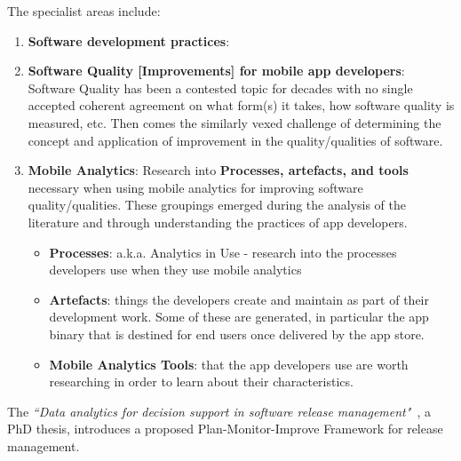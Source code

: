 The specialist areas include: 
\begin{enumerate}
    \item \textbf{Software development practices}: 
    \item \textbf{Software Quality [Improvements] for mobile app developers}: Software Quality has been a contested topic for decades with no single accepted coherent agreement on what form(s) it takes, how software quality is measured, etc. Then comes the similarly vexed challenge of determining the concept and application of improvement in the quality/qualities of software. 
    \item \textbf{Mobile Analytics}: Research into \textbf{Processes, artefacts, and tools} necessary when using mobile analytics for improving software quality/qualities. These groupings emerged during the analysis of the literature and through understanding the practices of app developers.
    \begin{itemize}
        \item \textbf{Processes}: a.k.a. Analytics in Use - research into the processes developers use when they use mobile analytics
        \item \textbf{Artefacts}: things the developers create and maintain as part of their development work. Some of these are generated, in particular the app binary that is destined for end users once delivered by the app store.
        \item \textbf{Mobile Analytics Tools}: that the app developers use are worth researching in order to learn about their characteristics.
    \end{itemize}
\end{enumerate}

    
The \emph{``Data analytics for decision support in software release management"}~, a PhD thesis, introduces a proposed Plan-Monitor-Improve Framework for release management.